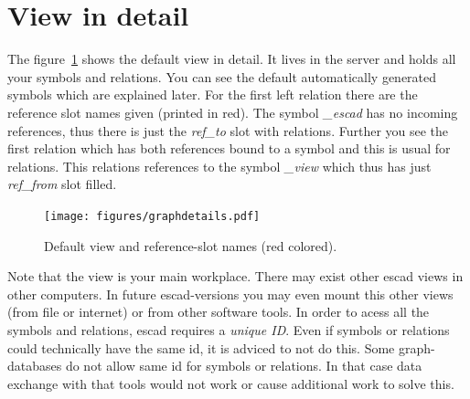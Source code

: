 \documentclass[a4paper, 12pt, openany]{scrbook}
\begin{document}
\section{View in detail}
The figure~\ref{fig:graphdetail} shows the default view in detail. It lives in the server and holds all your symbols and relations. You can see the default automatically generated symbols which are explained later. For the first left relation there are the reference slot names given (printed in red). The symbol \emph{\_escad} has no incoming references, thus there is just the \emph{ref\_to} slot with relations. Further you see the first relation which has both references bound to a symbol and this is usual for relations. This relations references to the symbol \emph{\_view} which thus has just \emph{ref\_from} slot filled.
\begin{figure}[htbp]
  \centering
  \texttt{[image: figures/graphdetails.pdf]}
  \caption{Default view and reference-slot names (red colored).}
  \label{fig:graphdetail}
\end{figure}
Note that the view is your main workplace. There may exist other escad views in other computers. In future escad-versions you may even mount this other views (from file or internet) or from other software tools. In order to acess all the symbols and relations, escad requires a \emph{unique ID}. Even if symbols or relations could technically have the same id, it is adviced to not do this. Some graph-databases do not allow same id for symbols or relations. In that case data exchange with that tools would not work or cause additional work to solve this.
\end{document}
